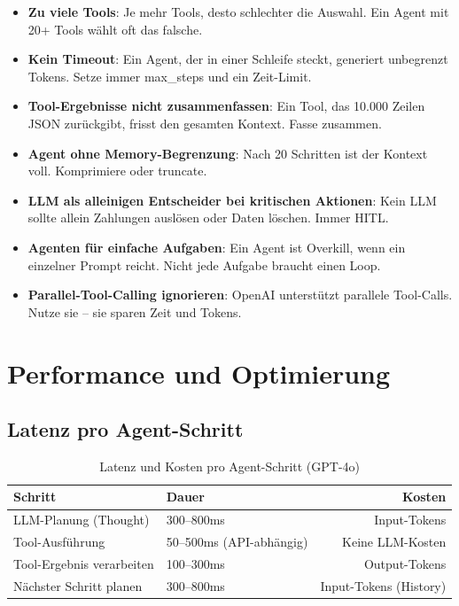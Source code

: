 \begin{itemize}[leftmargin=*]
    \item \textbf{Zu viele Tools}: Je mehr Tools, desto schlechter die Auswahl. Ein Agent mit 20+ Tools wählt oft das falsche.
    \item \textbf{Kein Timeout}: Ein Agent, der in einer Schleife steckt, generiert unbegrenzt Tokens. Setze immer max\_steps und ein Zeit-Limit.
    \item \textbf{Tool-Ergebnisse nicht zusammenfassen}: Ein Tool, das 10.000 Zeilen JSON zurückgibt, frisst den gesamten Kontext. Fasse zusammen.
    \item \textbf{Agent ohne Memory-Begrenzung}: Nach 20 Schritten ist der Kontext voll. Komprimiere oder truncate.
    \item \textbf{LLM als alleinigen Entscheider bei kritischen Aktionen}: Kein LLM sollte allein Zahlungen auslösen oder Daten löschen. Immer HITL.
    \item \textbf{Agenten für einfache Aufgaben}: Ein Agent ist Overkill, wenn ein einzelner Prompt reicht. Nicht jede Aufgabe braucht einen Loop.
    \item \textbf{Parallel-Tool-Calling ignorieren}: OpenAI unterstützt parallele Tool-Calls. Nutze sie -- sie sparen Zeit und Tokens.
\end{itemize}

\section{Performance und Optimierung}

\subsection{Latenz pro Agent-Schritt}

\begin{table}[H]
\centering
\begin{tabularx}{\linewidth}{lXr}
\toprule
\textbf{Schritt} & \textbf{Dauer} & \textbf{Kosten} \\
\midrule
LLM-Planung (Thought) & 300--800ms & Input-Tokens \\
Tool-Ausführung & 50--500ms (API-abhängig) & Keine LLM-Kosten \\
Tool-Ergebnis verarbeiten & 100--300ms & Output-Tokens \\
Nächster Schritt planen & 300--800ms & Input-Tokens (History) \\
\midrule
\end{tabularx}
\caption{Latenz und Kosten pro Agent-Schritt (GPT-4o)}
\label{tab:agentlatency}
\end{table}

